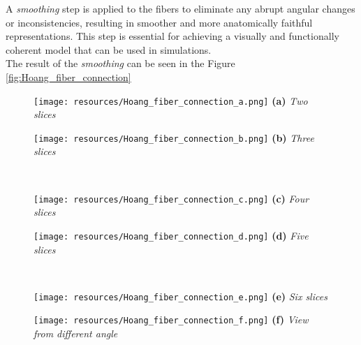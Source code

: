 \documentclass[english, bc, kiv, he, iso690alph, pdf, viewonly]{fasthesis}
\begin{document}
A \textit{smoothing} step is applied to the fibers to eliminate any abrupt angular changes or inconsistencies, resulting in smoother and more anatomically faithful representations. This step is essential for achieving a visually and functionally coherent model that can be used in simulations. \\ 
The result of the \textit{smoothing} can be seen in the Figure \ref{fig:Hoang_fiber_connection}

\newpage
\begin{figure}[h!]
	\centering
	\begin{minipage}[b]{0.4\textwidth}
		\centering
		\texttt{[image: resources/Hoang\_fiber\_connection\_a.png]}
		\textbf{(a)} \textit{Two slices}
    \end{minipage}
	\hspace{0.02\textwidth}
	\begin{minipage}[b]{0.4\textwidth}
		\centering
		\texttt{[image: resources/Hoang\_fiber\_connection\_b.png]}
		\textbf{(b)} \textit{Three slices}
    \end{minipage}
	\\
	\vspace{0.5cm} %
	\begin{minipage}[b]{0.4\textwidth}
		\centering
		\texttt{[image: resources/Hoang\_fiber\_connection\_c.png]}
		\textbf{(c)} \textit{Four slices}
    \end{minipage}
	\hspace{0.02\textwidth}
	\begin{minipage}[b]{0.4\textwidth}
		\centering
		\texttt{[image: resources/Hoang\_fiber\_connection\_d.png]}
		\textbf{(d)} \textit{Five slices}
    \end{minipage}
	\\
	\vspace{0.5cm} %
	\begin{minipage}[b]{0.4\textwidth}
		\centering
		\texttt{[image: resources/Hoang\_fiber\_connection\_e.png]}
		\textbf{(e)} \textit{Six slices}
    \end{minipage}
	\hspace{0.02\textwidth}
	\begin{minipage}[b]{0.4\textwidth}
		\centering
		\texttt{[image: resources/Hoang\_fiber\_connection\_f.png]}
		\textbf{(f)} \textit{View from different angle}
    \end{minipage}
	\\

\end{figure}
\end{document}
